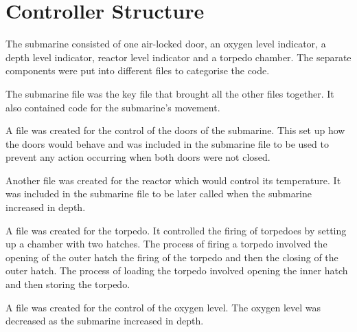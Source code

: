 \section{Controller Structure}

The submarine consisted of one air-locked door, an oxygen level indicator, a depth level indicator, reactor level indicator and a torpedo chamber. The separate components were put into different files to categorise the code.

The submarine file was the key file that brought all the other files together. It also contained code for the submarine's movement.

A file was created for the control of the doors of the submarine. This set up how the doors would behave and was included in the submarine file to be used to prevent any action occurring when both doors were not closed. 

Another file was created for the reactor which would control its temperature. It was included in the submarine file to be later called when the submarine increased in depth.

A file was created for the torpedo. It controlled the firing of torpedoes by setting up a chamber with two hatches. The process of firing a torpedo involved the opening of the outer hatch the firing of the torpedo and then the closing of the outer hatch. The process of loading the torpedo involved opening the inner hatch and then storing the torpedo.

A file was created for the control of the oxygen level. The oxygen level was decreased as the submarine increased in depth.